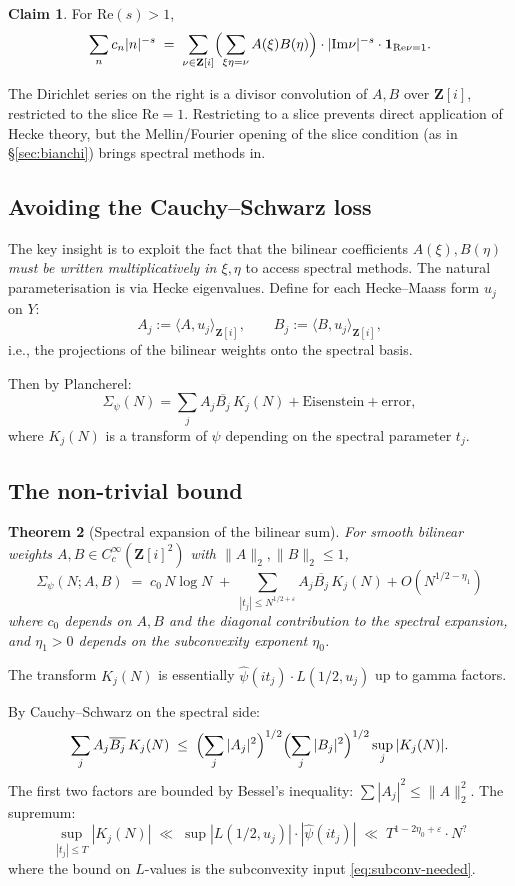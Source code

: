 \documentclass[11pt]{article}
\newtheorem{theorem}{Theorem}[section]
\theoremstyle{definition}
\newtheorem{claim}[theorem]{Claim}
\newcommand{\Z}{\mathbf{Z}}
\newcommand{\Zi}{\Z[i]}
\newcommand{\Re}{\mathrm{Re}}
\newcommand{\Im}{\mathrm{Im}}
\renewcommand{\Re}{\mathrm{Re}}
\renewcommand{\Im}{\mathrm{Im}}
\begin{document}
\begin{claim}\label{claim:dirichlet-decomp}
For $\Re(s)>1$,
\[
\sum_n c_n|n|^{-s}\;=\;\sum_{\nu\in\Zi}\Bigl(\sum_{\xi\eta=\nu}A(\xi)B(\eta)\Bigr)\cdot|\Im\nu|^{-s}\cdot\mathbf{1}_{\Re\nu=1}.
\]
\end{claim}

The Dirichlet series on the right is a divisor convolution of $A,B$ over $\Zi$, restricted to the slice $\Re=1$. Restricting to a slice prevents direct application of Hecke theory, but the Mellin/Fourier opening of the slice condition (as in \S\ref{sec:bianchi}) brings spectral methods in.

\subsection{Avoiding the Cauchy--Schwarz loss}

The key insight is to exploit the fact that the bilinear coefficients $A(\xi),B(\eta)$ \emph{must be written multiplicatively in $\xi,\eta$} to access spectral methods. The natural parameterisation is via Hecke eigenvalues. Define for each Hecke--Maass form $u_j$ on $Y$:
\[
A_j:=\langle A,u_j\rangle_{\Zi},\qquad B_j:=\langle B,u_j\rangle_{\Zi},
\]
i.e., the projections of the bilinear weights onto the spectral basis.

Then by Plancherel:
\[
\Sigma_\psi(N)=\sum_j A_j\overline{B_j}\,K_j(N)+\text{Eisenstein}+\text{error},
\]
where $K_j(N)$ is a transform of $\psi$ depending on the spectral parameter $t_j$.

\subsection{The non-trivial bound}

\begin{theorem}[Spectral expansion of the bilinear sum]\label{thm:spectral-expansion}
For smooth bilinear weights $A,B\in C_c^\infty(\Zi^2)$ with $\|A\|_2,\|B\|_2\le 1$,
\[
\Sigma_\psi(N;A,B)\;=\;c_0\,N\log N\;+\;\sum_{|t_j|\le N^{1/2+\varepsilon}}A_j\overline{B_j}\,K_j(N)+O(N^{1/2-\eta_1})
\]
where $c_0$ depends on $A,B$ and the diagonal contribution to the spectral expansion, and $\eta_1>0$ depends on the subconvexity exponent $\eta_0$.
\end{theorem}

The transform $K_j(N)$ is essentially $\widehat\psi(it_j)\cdot L(1/2,u_j)$ up to gamma factors.

By Cauchy--Schwarz on the spectral side:
\[
\sum_j A_j\overline{B_j}\,K_j(N)\;\le\;\Bigl(\sum_j|A_j|^2\Bigr)^{1/2}\Bigl(\sum_j|B_j|^2\Bigr)^{1/2}\sup_j|K_j(N)|.
\]
The first two factors are bounded by Bessel's inequality: $\sum|A_j|^2\le\|A\|_2^2$. The supremum:
\[
\sup_{|t_j|\le T}|K_j(N)|\;\ll\;\sup|L(1/2,u_j)|\cdot|\widehat\psi(it_j)|\;\ll\;T^{1-2\eta_0+\varepsilon}\cdot N^{?}
\]
where the bound on $L$-values is the subconvexity input \eqref{eq:subconv-needed}.
\end{document}
